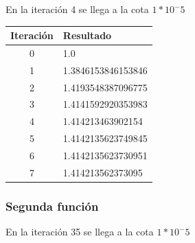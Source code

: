 \documentclass[titlepage,a4paper]{article}
\begin{document}
En la iteración 4 se llega a la cota $1*10^-5$

\begin{center}
    \begin{tabular}{| c | l |}
    \hline
     Iteración & Resultado \\ \hline
 0     &  1.0 \\
1     &  1.3846153846153846 \\
2     &  1.4193548387096775 \\
3     &  1.4141592920353983 \\
4     &  1.414213463902154 \\
5     &  1.4142135623749845 \\
6     &  1.4142135623730951 \\
7     &  1.414213562373095 \\
    \hline
    \end{tabular}
\end{center}

\subsubsection{Segunda función}\label{sec:sec2}
En la iteración 35 se llega a la cota $1*10^-5$
\end{document}
